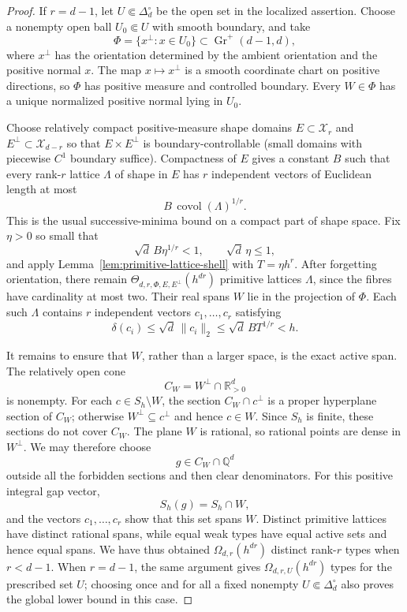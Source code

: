 \documentclass[11pt,reqno]{amsart}
\theoremstyle{definition}
\theoremstyle{remark}
\begin{document}
\begin{proof}
If $r=d-1$, let $U\Subset\Delta_{d}^{\circ}$ be the open set in the
localized assertion. Choose a nonempty open ball
$U_0\Subset U$ with smooth boundary, and take
\[
 \Phi=\{x^\perp:x\in U_0\}\subset\operatorname{Gr}^+(d-1,d),
\]
where $x^\perp$ has the orientation determined by the ambient orientation
and the positive normal $x$.
The map $x\mapsto x^\perp$ is a smooth coordinate chart on positive
directions, so $\Phi$ has positive measure and controlled boundary.
Every $W\in\Phi$ has a unique normalized positive normal lying in $U_0$.

Choose relatively compact positive-measure shape domains $E\subset\mathcal
X_r$ and $E^\perp\subset\mathcal X_{d-r}$ so that
$E\times E^\perp$ is boundary-controllable (small domains with piecewise
$C^1$ boundary suffice). Compactness of $E$ gives a constant
$B$ such that every rank-$r$ lattice $\Lambda$ of shape in $E$ has
$r$ independent vectors of Euclidean length at most
\[
 B\,\operatorname{covol}(\Lambda)^{1/r}.
\]
This is the usual successive-minima bound on a compact part of shape
space. Fix $\eta>0$ so small that
\[
 \sqrt d\,B\eta^{1/r}<1,\qquad \sqrt d\,\eta\leq1,
\]
and apply Lemma~\ref{lem:primitive-lattice-shell} with
$T=\eta h^r$.  After forgetting orientation, there remain
$\Theta_{d,r,\Phi,E,E^\perp}(h^{dr})$ primitive lattices $\Lambda$, since the
fibres have cardinality at most two.  Their real spans $W$ lie in the
projection of $\Phi$.  Each such $\Lambda$ contains $r$ independent vectors
$c_1,\ldots,c_r$ satisfying
\[
 \delta(c_i)\leq\sqrt d\,\|c_i\|_2
 \leq\sqrt d\,B T^{1/r}<h.
\]

It remains to ensure that $W$, rather than a larger space, is the exact
active span. The relatively open cone
\[
 C_W=W^\perp\cap\mathbb R_{>0}^d
\]
is nonempty. For each $c\in S_h\setminus W$, the section
$C_W\cap c^\perp$ is a proper hyperplane section of $C_W$; otherwise
$W^\perp\subseteq c^\perp$ and hence $c\in W$. Since $S_h$ is finite,
these sections do not cover $C_W$. The plane $W$ is rational, so rational
points are dense in $W^\perp$. We may therefore choose
\[
 g\in C_W\cap\mathbb Q^d
\]
outside all the forbidden sections and then clear denominators. For this
positive integral gap vector,
\[
 S_h(g)=S_h\cap W,
\]
and the vectors $c_1,\ldots,c_r$ show that this set spans $W$. Distinct
primitive lattices have distinct rational spans, while equal weak types
have equal active sets and hence equal spans.  We have thus obtained
$\Omega_{d,r}(h^{dr})$ distinct rank-$r$ types when $r<d-1$.  When
$r=d-1$, the same argument gives $\Omega_{d,r,U}(h^{dr})$ types for the
prescribed set $U$; choosing once and for all a fixed nonempty
$U\Subset\Delta_d^\circ$ also proves the global lower bound in this case.


\end{proof}
\end{document}
